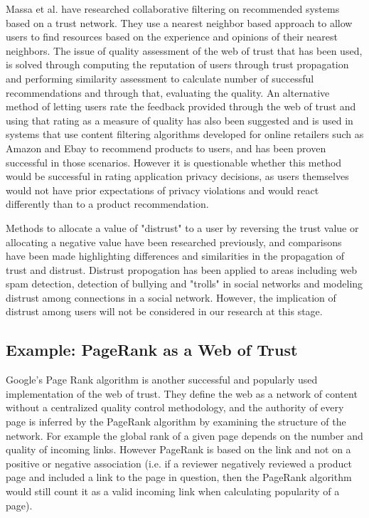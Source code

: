 Massa et al. have researched collaborative filtering on recommended systems based on a trust network\cite{massa2004trust}. They use a nearest neighbor based approach to allow users to find resources based on the experience and opinions of their nearest neighbors. The issue of quality assessment of the web of trust that has been used, is solved through computing the reputation of users through trust propagation and performing similarity assessment to calculate number of successful recommendations and through that, evaluating the quality. An alternative method of letting users rate the feedback provided through the web of trust and using that rating as a measure of quality has also been suggested and is used in systems that use content filtering algorithms developed for online retailers such as Amazon and Ebay to recommend products to users, and has been proven successful in those scenarios. However it is questionable whether this method would be successful in rating application privacy decisions, as users themselves would not have prior expectations of privacy violations and would react differently than to a product recommendation. 
\smallskip

Methods to allocate a value of "distrust" to a user by reversing the trust value or allocating a negative value have been researched previously, and comparisons have been made highlighting differences and similarities in the propagation of trust and distrust\cite{guha2004propagation}. Distrust propogation has been applied to areas including web spam detection\cite{wu2006propagating}, detection of bullying and "trolls" in social networks\cite{ortega2012propagation} and modeling distrust among connections in a social network\cite{ziegler2005propagation}. However, the implication of distrust among users will not be considered in our research at this stage. 


\subsection{Example: PageRank as a Web of Trust}
Google's Page Rank algorithm is another successful and popularly used implementation of the web of trust\cite{page1999pagerank}. They define the web as a network of content without a centralized quality control methodology, and the authority of every page is inferred by the PageRank algorithm by examining the structure of the network. For example the global rank of a given page depends on the number and quality of incoming links. However PageRank is based on the link and not on a positive or negative association (i.e. if a reviewer negatively reviewed a product page and included a link to the page in question, then the PageRank algorithm would still count it as a valid incoming link when calculating popularity of a page). 
\smallskip

